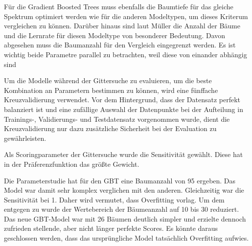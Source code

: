 Für die Gradient Boosted Trees muss ebenfalls die Baumtiefe für das gleiche Spektrum optimiert werden wie für die anderen Modeltypen, um dieses Kriterum vergleichen zu können. Darüber hinaus sind laut Müller  die Anzahl der Bäume und die Lernrate für diesen Modeltype von besonderer Bedeutung. Davon abgesehen muss die Baumanzahl für den Vergleich eingegrenzt werden. Es ist wichtig beide Parametre parallel zu betrachten, weil diese von einander abhängig sind 

Um die Modelle während der Gittersuche zu evaluieren, um die beste Kombination an Parametern bestimmen zu können, wird eine fünffache Kreuzvalidierung verwendet. Vor dem Hintergrund, dass der Datensatz perfekt balanziert ist und eine zufällige Auswahl der Datenpunkte bei der Aufteilung in Trainings-, Validierungs- und Testdatensatz vorgenommen wurde, dient die Kreuzvalidierung nur dazu zusätzliche Sicherheit bei der Evaluation zu gewährleisten.

Als Scoringparameter der Gittersuche wurde die Sensitivität gewählt. Diese hat in der Präferenzfunktion das größte Gewicht. 

Die Parameterstudie hat für den GBT eine Baumanzahl von 95 ergeben. Das Model war damit sehr komplex verglichen mit den anderen. Gleichzeitig war die Sensitivität bei 1. Daher wird vermutet, dass Overfitting vorlag. Um dem entgegen zu wurde der Wertebereich der Bäumeanzahl auf 10 bis 30 reduziert. Das neue GBT-Model war mit 26 Bäumen deutlich simpler und erzielte dennoch zufrieden stellende, aber nicht länger perfekte Scores. Es könnte daraus geschlossen werden, dass das ursprüngliche Model tatsächlich Overfitting aufwies.

